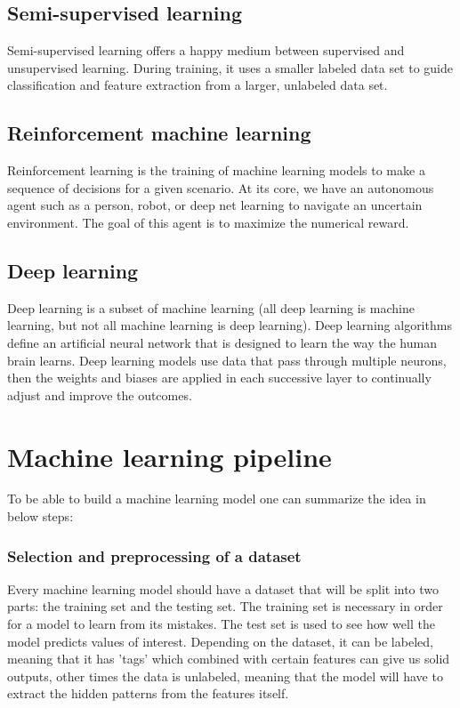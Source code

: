 \documentclass[a4paper,oneside,openright,11pt]{book}
\begin{document}
\subsection{Semi-supervised learning }

Semi-supervised learning offers a happy medium between supervised and unsupervised learning. During training, it uses a smaller labeled data set to guide classification and feature extraction from a larger, unlabeled data set.

\subsection{Reinforcement machine learning}

Reinforcement learning is the training of machine learning models to make a sequence of decisions for a given scenario.
At its core, we have an autonomous agent such as a person, robot, or deep net learning to navigate an uncertain environment. The goal of this agent is to maximize the numerical reward.


\subsection{Deep learning}

Deep learning is a subset of machine learning (all deep learning is machine learning, but not all machine learning is deep learning). Deep learning algorithms define an artificial neural network that is designed to learn the way the human brain learns. Deep learning models use data that pass through multiple neurons, then the weights and biases are applied in each successive layer to continually adjust and improve the outcomes.


\section{Machine learning pipeline}

To be able to build a machine learning model one can summarize the idea in below steps\cite{what_ML_IBM}:

\subsubsection{Selection and preprocessing of a dataset}

Every machine learning model should have a dataset that will be split into two parts: the training set and the testing set. The training set is necessary in order for a model to learn from its mistakes. The test set is used to see how well the model predicts values of interest. Depending on the dataset, it can be labeled, meaning that it has 'tags' which combined with certain features can give us solid outputs, other times the data is unlabeled, meaning that the model will have to extract the hidden patterns from the features itself.
\end{document}
